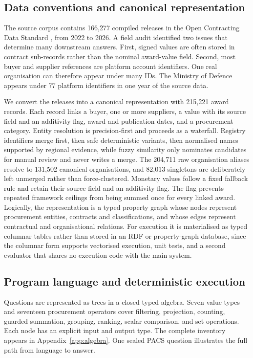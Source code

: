 \documentclass{article}
\begin{document}
\subsection{Data conventions and canonical representation}
\label{sec:data}

The source corpus contains 166{,}277 compiled releases in the Open
Contracting Data Standard \citep{ocds}, from 2022 to 2026.
A field audit identified two issues that determine many downstream answers.
First, signed values are often stored in contract sub-records rather than the
nominal award-value field. Second, most buyer and supplier references are
platform account identifiers. One real organisation can therefore appear
under many IDs. The Ministry of Defence appears under 77 platform identifiers
in one year of the source data.

We convert the releases into a canonical representation with 215{,}221
award records. Each record links a buyer, one or more suppliers, a value
with its source field and an additivity flag, award and publication dates,
and a procurement category. Entity resolution is precision-first and
proceeds as a waterfall. Registry identifiers merge first, then safe
deterministic variants, then normalised names supported by regional
evidence, while fuzzy similarity only nominates candidates for manual
review and never writes a merge. The 204{,}711 raw organisation aliases
resolve to 131{,}502 canonical organisations, and 82{,}013 singletons are
deliberately left unmerged rather than force-clustered. Monetary values follow a
fixed fallback rule and retain their source field and an additivity flag. The
flag prevents repeated framework ceilings from being summed once for every
linked award. Logically, the representation is a typed property graph whose nodes
represent procurement entities, contracts and classifications, and whose
edges represent contractual and organisational relations. For execution
it is materialised as typed columnar tables rather than stored in an RDF
or property-graph database, since the columnar form supports vectorised
execution, unit tests, and a second evaluator that shares no execution
code with the main system.

\subsection{Program language and deterministic execution}
\label{sec:algebra}

Questions are represented as trees in a closed typed algebra. Seven value
types and seventeen procurement operators cover filtering, projection,
counting, guarded summation, grouping, ranking, scalar comparison, and set
operations. Each node has an explicit input and output type. The complete
inventory appears in Appendix~\ref{app:algebra}. One sealed PACS question
illustrates the full path from language to answer.
\end{document}
